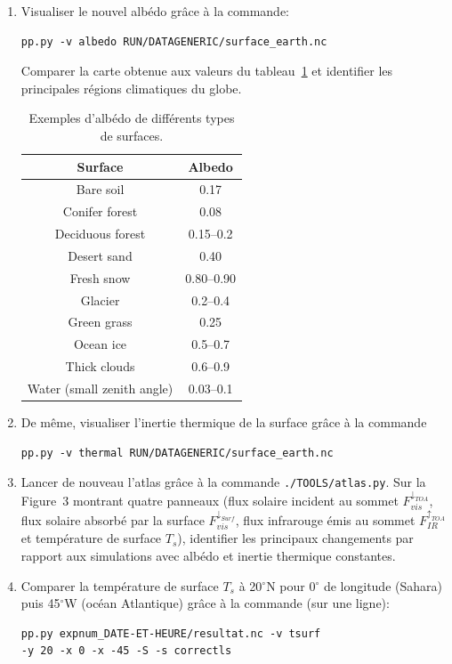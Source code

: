 \documentclass[a4paper,12pt]{article}
\begin{document}
\begin{enumerate}
\item Visualiser le nouvel albédo grâce à la commande:
\begin{verbatim}
pp.py -v albedo RUN/DATAGENERIC/surface_earth.nc
\end{verbatim}
Comparer la carte obtenue aux valeurs du tableau~\ref{tab-albedo} et identifier
les principales régions climatiques du globe.
\begin{table}[h!]
\centering
\begin{tabular}{cc}
\textbf{Surface} & \textbf{Albedo} \\ \hline
Bare soil & 0.17 \\
Conifer forest & 0.08 \\
Deciduous forest & 0.15--0.2 \\
Desert sand & 0.40 \\
Fresh snow & 0.80--0.90 \\
Glacier & 0.2--0.4 \\
Green grass & 0.25 \\
Ocean ice & 0.5--0.7 \\
Thick clouds & 0.6--0.9 \\
Water (small zenith angle) & 0.03--0.1 \\
\end{tabular}
\caption{Exemples d'albédo de différents types de surfaces.}
\label{tab-albedo}
\end{table}

\item De même, visualiser l'inertie thermique de la surface grâce à la commande
\begin{verbatim}
pp.py -v thermal RUN/DATAGENERIC/surface_earth.nc
\end{verbatim}
\item Lancer de nouveau l'atlas grâce à la commande \texttt{./TOOLS/atlas.py}.
Sur la Figure~3 montrant quatre panneaux (flux solaire incident au sommet $F_
{vis}^{\downarrow_{TOA}}$, flux solaire absorbé par la surface $F_{vis}^
{\downarrow_{Surf}}$, flux infrarouge émis au sommet $F_{IR}^{\uparrow_{TOA}}$
et température de surface $T_s$), identifier les principaux changements par
rapport aux simulations avec albédo et inertie thermique constantes.
\item Comparer la température de surface $T_s$ à 20$^\circ$N pour 0$^\circ$ de
longitude (Sahara) puis 45$^\circ$W (océan Atlantique) grâce à la commande (sur
une ligne):

\begin{verbatim}
pp.py expnum_DATE-ET-HEURE/resultat.nc -v tsurf
-y 20 -x 0 -x -45 -S -s correctls
\end{verbatim}


\end{enumerate}
\end{document}
